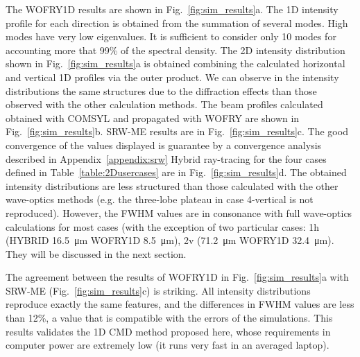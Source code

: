 \documentclass{iucr}              %
\begin{document}
The WOFRY1D results are shown in Fig.~\ref{fig:sim_results}a. The 1D intensity profile for each direction is obtained from the summation of several modes. High modes have very low eigenvalues. It is sufficient to consider only 10 modes for accounting more that 99\% of the spectral density. The 2D intensity distribution shown in Fig.~\ref{fig:sim_results}a is obtained combining the calculated horizontal and vertical 1D profiles via the outer product. 
We can observe in the intensity distributions the same structures due to the diffraction effects than those observed with the other calculation methods.
The beam profiles calculated obtained with COMSYL and propagated with WOFRY are shown in Fig.~\ref{fig:sim_results}b. 
SRW-ME results are in Fig.~\ref{fig:sim_results}c. The good convergence of the values displayed is guarantee by a convergence analysis described in Appendix~\ref{appendix:srw}
Hybrid ray-tracing for the four cases defined in Table~\ref{table:2Dusercases} are in  Fig.~\ref{fig:sim_results}d. The obtained intensity distributions are less structured than those calculated with the other wave-optics methods (e.g. the three-lobe plateau in case 4-vertical is not reproduced). However, the FWHM values are in consonance with full wave-optics calculations for most cases (with the exception of two particular cases:
1h (HYBRID \SI{16.5}{\micro\meter} WOFRY1D \SI{8.5}{\micro\meter}),
2v (\SI{71.2}{\micro\meter} WOFRY1D \SI{32.4}{\micro\meter}). They will be discussed in the next section.

The agreement between the results of WOFRY1D in Fig.~\ref{fig:sim_results}a with SRW-ME (Fig.~\ref{fig:sim_results}c) is striking. All intensity distributions reproduce exactly the same features, and the differences in FWHM values are less than 12\%, a value that is compatible with the errors of the simulations. 
This results validates the 1D CMD method proposed here, whose requirements in computer power are extremely low (it runs very fast in an averaged laptop). 
\end{document}

